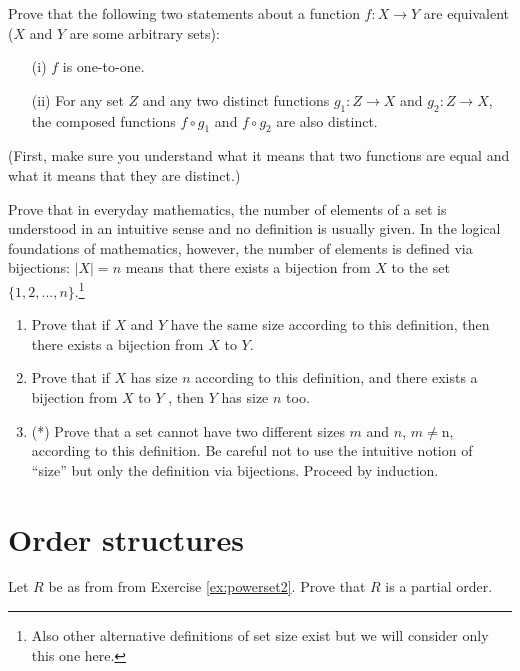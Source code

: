 \documentclass[11pt,paper=b5,footinclude,headinclude]{scrbook} %
\theoremstyle{remark}
\theoremstyle{definition} %
\theoremstyle{theorem} %
\newtheorem{ex}{Exercise\hypertarget{sol:\theex}}[chapter]
\begin{document}
\begin{ex}
Prove that the following two statements about a function \( f : X \to Y \) are equivalent (\( X \) and \( Y \) are some arbitrary sets):
\begin{enumerate}
    \item[(i)] \( f \) is one-to-one.
    \item[(ii)] For any set \( Z \) and any two distinct functions \( g_1 : Z \to X \) and \( g_2 : Z \to X \), the composed functions \( f \circ g_1 \) and \( f \circ g_2 \) are also distinct.
\end{enumerate}
(First, make sure you understand what it means that two functions are equal and what it means that they are distinct.)
\end{ex}

\begin{ex}
Prove that in everyday mathematics, the number of elements of a set is understood in an intuitive sense and no definition is usually given. In the logical foundations of mathematics, however, the number of elements 
is defined via bijections: 
$|X| = n$ means that there exists a bijection
from $X$ to the set $\{1, 2, . . . , n\}$.\footnote{Also other alternative definitions of
set size exist but we will consider only this one here.}
\begin{enumerate}
    \item Prove that if $X$ and $Y$ have the same size according to this definition,
then there exists a bijection from $X$ to $Y$.
\item Prove that if $X$ has size $n$ according to this definition, and there
exists a bijection from $X$ to $Y$ , then $Y$ has size $n$ too.
\item (*) Prove that a set cannot have two different sizes $m$ and $n$, $m \neq $n,
according to this definition. Be careful not to use the intuitive notion
of “size” but only the definition via bijections. Proceed by induction.
\end{enumerate}

\end{ex}



\section{Order structures}
\begin{ex}
Let $R$ be as from from Exercise \ref{ex:powerset2}.
    Prove that \(R\) is a partial order. 
\end{ex}
\end{document}
